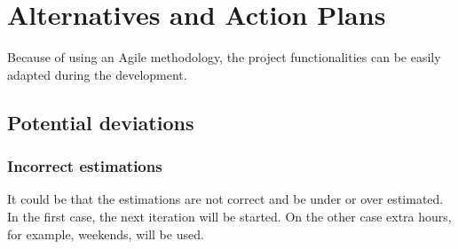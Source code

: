 \section{Alternatives and Action Plans}
Because of using an Agile methodology, the project functionalities can be easily adapted during the development. 

\subsection{Potential deviations}
\subsubsection{Incorrect estimations}
It could be that the estimations are not correct and be under or over estimated. In the first case, the next iteration will be started. On the other case extra hours, for example, weekends, will be used.

